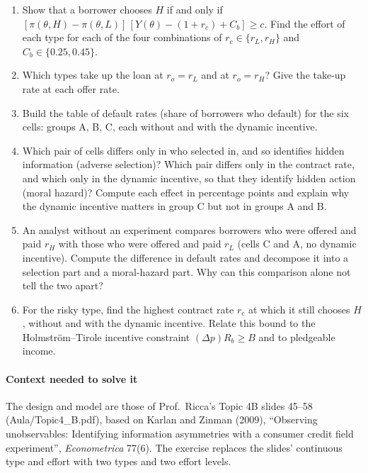 \documentclass[11pt,a4paper]{article}
\begin{document}
\begin{enumerate}
\def\labelenumi{(\alph{enumi})}
\item
  Show that a borrower chooses \(H\) if and only if
  \([\pi(\theta, H) - \pi(\theta, L)]\,[Y(\theta) - (1 + r_c) + C_b] \ge c\). Find the effort of
  each type for each of the four combinations of \(r_c \in \{r_L, r_H\}\) and
  \(C_b \in \{0.25, 0.45\}\).
\item
  Which types take up the loan at \(r_o = r_L\) and at \(r_o = r_H\)? Give the take-up rate at each
  offer rate.
\item
  Build the table of default rates (share of borrowers who default) for the six cells: groups A, B,
  C, each without and with the dynamic incentive.
\item
  Which pair of cells differs only in who selected in, and so identifies hidden information (adverse
  selection)? Which pair differs only in the contract rate, and which only in the dynamic incentive,
  so that they identify hidden action (moral hazard)? Compute each effect in percentage points and
  explain why the dynamic incentive matters in group C but not in groups A and B.
\item
  An analyst without an experiment compares borrowers who were offered and paid \(r_H\) with those
  who were offered and paid \(r_L\) (cells C and A, no dynamic incentive). Compute the difference in
  default rates and decompose it into a selection part and a moral-hazard part. Why can this
  comparison alone not tell the two apart?
\item
  For the risky type, find the highest contract rate \(r_c\) at which it still chooses \(H\),
  without and with the dynamic incentive. Relate this bound to the Holmström--Tirole incentive
  constraint \((\Delta p) R_b \ge B\) and to pledgeable income.
\end{enumerate}

\paragraph{Context needed to solve it}

The design and model are those of Prof.~Ricca's Topic 4B slides 45--58 (Aula/Topic4\_B.pdf), based
on Karlan and Zinman (2009), ``Observing unobservables: Identifying information asymmetries with a
consumer credit field experiment'', \emph{Econometrica} 77(6). The exercise replaces the slides'
continuous type and effort with two types and two effort levels.
\end{document}
